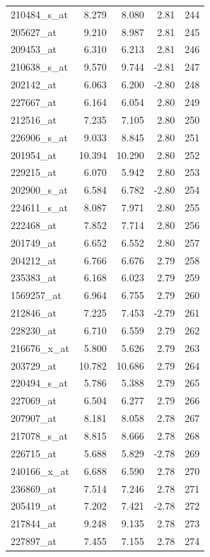 \begin{footnotesize}
\begin{longtable}{lrrrr}
210484\_s\_at & 8.279 & 8.080 & 2.81 & 244 \\
205627\_at & 9.210 & 8.987 & 2.81 & 245 \\
209453\_at & 6.310 & 6.213 & 2.81 & 246 \\
210638\_s\_at & 9.570 & 9.744 & -2.81 & 247 \\
202142\_at & 6.063 & 6.200 & -2.80 & 248 \\
227667\_at & 6.164 & 6.054 & 2.80 & 249 \\
212516\_at & 7.235 & 7.105 & 2.80 & 250 \\
226906\_s\_at & 9.033 & 8.845 & 2.80 & 251 \\
201954\_at & 10.394 & 10.290 & 2.80 & 252 \\
229215\_at & 6.070 & 5.942 & 2.80 & 253 \\
202900\_s\_at & 6.584 & 6.782 & -2.80 & 254 \\
224611\_s\_at & 8.087 & 7.971 & 2.80 & 255 \\
222468\_at & 7.852 & 7.714 & 2.80 & 256 \\
201749\_at & 6.652 & 6.552 & 2.80 & 257 \\
204212\_at & 6.766 & 6.676 & 2.79 & 258 \\
235383\_at & 6.168 & 6.023 & 2.79 & 259 \\
1569257\_at & 6.964 & 6.755 & 2.79 & 260 \\
212846\_at & 7.225 & 7.453 & -2.79 & 261 \\
228230\_at & 6.710 & 6.559 & 2.79 & 262 \\
216676\_x\_at & 5.800 & 5.626 & 2.79 & 263 \\
203729\_at & 10.782 & 10.686 & 2.79 & 264 \\
220494\_s\_at & 5.786 & 5.388 & 2.79 & 265 \\
227069\_at & 6.504 & 6.277 & 2.79 & 266 \\
207907\_at & 8.181 & 8.058 & 2.78 & 267 \\
217078\_s\_at & 8.815 & 8.666 & 2.78 & 268 \\
226715\_at & 5.688 & 5.829 & -2.78 & 269 \\
240166\_x\_at & 6.688 & 6.590 & 2.78 & 270 \\
236869\_at & 7.514 & 7.246 & 2.78 & 271 \\
205419\_at & 7.202 & 7.421 & -2.78 & 272 \\
217844\_at & 9.248 & 9.135 & 2.78 & 273 \\
227897\_at & 7.455 & 7.155 & 2.78 & 274 \\

\end{longtable}
\end{footnotesize}
